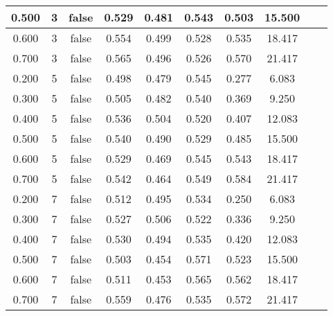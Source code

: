 \begin{longtable}[c]{|c|c|c|c|c|c|c|c|c|c|}
 0.500 & 3 & false & 0.529 & 0.481 & 0.543 & 0.503 & 15.500  \\ \hline 
 0.600 & 3 & false & 0.554 & 0.499 & 0.528 & 0.535 & 18.417  \\ \hline 
 0.700 & 3 & false & 0.565 & 0.496 & 0.526 & 0.570 & 21.417  \\ \hline 
 0.200 & 5 & false & 0.498 & 0.479 & 0.545 & 0.277 & 6.083  \\ \hline 
 0.300 & 5 & false & 0.505 & 0.482 & 0.540 & 0.369 & 9.250  \\ \hline 
 0.400 & 5 & false & 0.536 & 0.504 & 0.520 & 0.407 & 12.083  \\ \hline 
 0.500 & 5 & false & 0.540 & 0.490 & 0.529 & 0.485 & 15.500  \\ \hline 
 0.600 & 5 & false & 0.529 & 0.469 & 0.545 & 0.543 & 18.417  \\ \hline 
 0.700 & 5 & false & 0.542 & 0.464 & 0.549 & 0.584 & 21.417  \\ \hline 
 0.200 & 7 & false & 0.512 & 0.495 & 0.534 & 0.250 & 6.083  \\ \hline 
 0.300 & 7 & false & 0.527 & 0.506 & 0.522 & 0.336 & 9.250  \\ \hline 
 0.400 & 7 & false & 0.530 & 0.494 & 0.535 & 0.420 & 12.083  \\ \hline 
 0.500 & 7 & false & 0.503 & 0.454 & 0.571 & 0.523 & 15.500  \\ \hline 
 0.600 & 7 & false & 0.511 & 0.453 & 0.565 & 0.562 & 18.417  \\ \hline 
 0.700 & 7 & false & 0.559 & 0.476 & 0.535 & 0.572 & 21.417  \\ \hline 
 \end{longtable} 

\newpage


